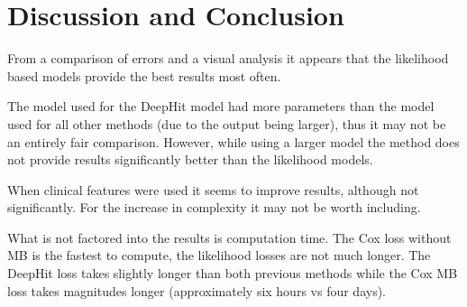 \vspace{-0.25cm}

\section{Discussion and Conclusion} \label{sec:discussion}
    From a comparison of errors and a visual analysis it appears that the likelihood based models provide the best results most often.
    
    The model used for the DeepHit model had more parameters than the model used for all other methods (due to the output being larger), thus it may not be an entirely fair comparison. However, while using a larger model the method does not provide results significantly better than the likelihood models.
    
    When clinical features were used it seems to improve results, although not significantly. For the increase in complexity it may not be worth including.
    
    What is not factored into the results is computation time. The Cox loss without \gls{MB} is the fastest to compute, the likelihood losses are not much longer. The DeepHit loss takes slightly longer than both previous methods while the Cox \gls{MB} loss takes magnitudes longer (approximately six hours vs four days).

